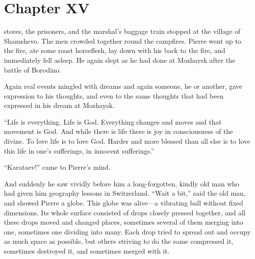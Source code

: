 
\chapter*{Chapter XV} \ifaudio {}
\fi

 stores, the prisoners, and the marshal's baggage train
stopped at the village of Shamshevo. The men crowded together
round the campfires.  Pierre went up to the fire, ate some roast
horseflesh, lay down with his back to the fire, and immediately
fell asleep. He again slept as he had done at Mozhaysk after the
battle of Borodino.

Again real events mingled with dreams and again someone, he or
another, gave expression to his thoughts, and even to the same
thoughts that had been expressed in his dream at Mozhaysk.

``Life is everything. Life is God. Everything changes and moves
and that movement is God. And while there is life there is joy in
consciousness of the divine. To love life is to love God. Harder
and more blessed than all else is to love this life in one's
sufferings, in innocent sufferings.''

``Karataev!'' came to Pierre's mind.

And suddenly he saw vividly before him a long-forgotten, kindly
old man who had given him geography lessons in
Switzerland. ``Wait a bit,'' said the old man, and showed Pierre
a globe. This globe was alive---a vibrating ball without fixed
dimensions. Its whole surface consisted of drops closely pressed
together, and all these drops moved and changed places, sometimes
several of them merging into one, sometimes one dividing into
many. Each drop tried to spread out and occupy as much space as
possible, but others striving to do the same compressed it,
sometimes destroyed it, and sometimes merged with it.

